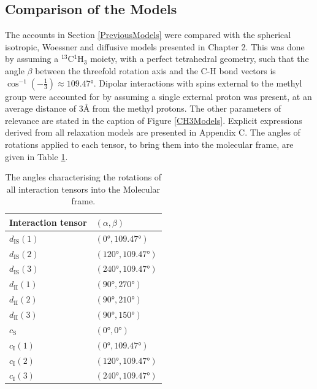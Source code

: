 \subsection{Comparison of the Models}
The accounts in Section \ref{PreviousModels} were compared with the spherical isotropic, Woessner and diffusive models presented in Chapter 2. This was done by assuming a $^{13}$C$^{1}$H$_{3}$ moiety, with a perfect tetrahedral geometry, such that the angle $\beta$ between the threefold rotation axis and the C-H bond vectors is $\cos^{-1}(-\frac{1}{3}) \approx \ang{109.47}$. Dipolar interactions with spins external to the methyl group were accounted for by assuming a single external proton was present, at an average distance of $\num{3} \si{\angstrom}$ from the methyl protons. The other parameters of relevance are stated in the caption of Figure \ref{CH3Models}. Explicit expressions derived from all relaxation models are presented in Appendix C. The angles of rotations applied to each tensor, to bring them into the molecular frame, are given in Table \ref{tab3.1}.\\
\begin{table}[]
\centering
\begin{tabular}{l|l}
Interaction tensor & $(\alpha, \beta)$           \\ \hline
$d_{\text{IS}} (1)$                              & $(\ang{0}, \ang{109.47})$   \\
$d_{\text{IS}} (2)$                              & $(\ang{120}, \ang{109.47})$ \\
$d_{\text{IS}} (3)$                              & $(\ang{240}, \ang{109.47})$ \\
$d_{\text{II}} (1)$                              & $(\ang{90}, \ang{270})$     \\
$d_{\text{II}} (2)$                              & $(\ang{90}, \ang{210})$     \\
$d_{\text{II}} (3)$                              & $(\ang{90}, \ang{150})$     \\
$c_{\text{S}}$                                   & $(\ang{0}, \ang{0})$        \\
$c_{\text{I}} (1)$                               & $(\ang{0}, \ang{109.47})$   \\
$c_{\text{I}} (2)$                               & $(\ang{120}, \ang{109.47})$ \\
$c_{\text{I}} (3)$                               & $(\ang{240}, \ang{109.47})$
\end{tabular}
\caption{The angles characterising the rotations of all interaction tensors into the Molecular frame.}
\label{tab3.1}
\end{table}
